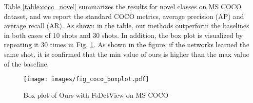 \documentclass[10pt,twocolumn,letterpaper]{article}
\begin{document}
\vspace{+0.15cm}
\quad Table \ref{table:coco_novel} summarizes the results for novel classes on MS COCO dataset, and we report the standard COCO metrics, average precision (AP) and average recall (AR). As shown in the table, our methods outperform the baselines in both cases of 10 shots and 30 shots. In addition, the box plot is visualized by repeating it 30 times in Fig. \ref{fig:coco_box_plot}. As shown in the figure, if the networks learned the same shot, it is confirmed that the min value of ours is higher than the max value of the baseline.

\begin{figure}
    \centering
    \texttt{[image: images/fig\_coco\_boxplot.pdf]}
    \vspace{-0.3cm}
    \caption{Box plot of Ours with FsDetView on MS COCO}
    \label{fig:coco_box_plot}
\end{figure}
\end{document}
